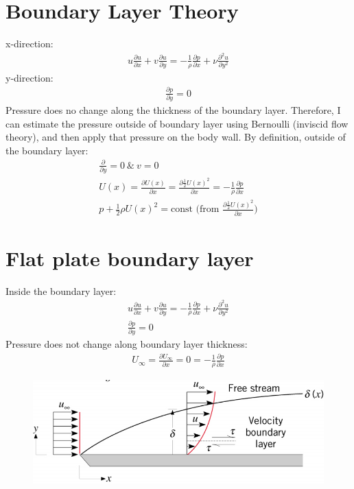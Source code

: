 \documentclass[class=report, crop=false, 12pt,a4paper]{standalone}
\begin{document}
\section{Boundary Layer Theory}
x-direction:
\begin{align}
  u \frac{\partial u}{\partial x} + v \frac{\partial u}{\partial y} = - \frac{1}{\rho} \frac{\partial p}{\partial x} + \nu \frac{\partial^2 u}{\partial y^2}
\end{align}
y-direction:
\begin{align}
  \frac{\partial p}{\partial y} = 0
\end{align}
Pressure does no change along the thickness of the boundary layer. Therefore, I can estimate the pressure outside of boundary layer using Bernoulli (inviscid flow theory), and then apply that pressure on the body wall. By definition, outside of the boundary layer:
\begin{gather}
  \frac{\partial}{\partial y} = 0 \ \& \ v = 0\\
  U(x) = \frac{\partial U(x)}{\partial x} = \frac{\partial \frac{1}{2} U(x)^2}{\partial x} = - \frac{1}{\rho} \frac{\partial p}{\partial x}\\
  p + \frac{1}{2} \rho U(x)^2 = \textrm{const (from } \frac{\partial \frac{1}{2} U(x)^2}{\partial x}\textrm{)}
\end{gather}
\section{Flat plate boundary layer}
Inside the boundary layer:
\begin{align}
  u \frac{\partial u}{\partial x} + v\frac{\partial u}{\partial y} = -\frac{1}{\rho} \frac{\partial p}{\partial x} + \nu \frac{\partial^2 u}{\partial y^2}\\
  \frac{\partial p}{\partial y} = 0
\end{align}
Pressure does not change along boundary layer thickness:
\begin{align}
  U_\infty = \frac{\partial U_\infty}{\partial x} = 0 = -\frac{1}{\rho} \frac{\partial p}{\partial x}
\end{align}
\begin{figure}[H]
  \centering
  \includegraphics[width = 0.8 \textwidth]{../img/diagram67.png}
  \caption{}
\end{figure}
\end{document}
